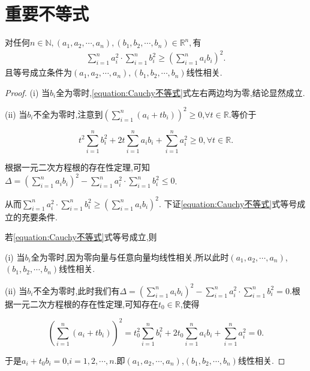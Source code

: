 \documentclass[../../main.tex]{subfiles}
\begin{document}
\section{重要不等式}

\begin{theorem}[Cauchy不等式]\label{theorem:Cauchy不等式}
对任何$n\in \mathbb{N} ,\left( a_1,a_2,\cdots ,a_n \right) ,\left( b_1,b_2,\cdots ,b_n \right) \in \mathbb{R} ^n,$有
\begin{align}\label{equation:Cauchy不等式}
\sum\limits_{i=1}^n{a_{i}^{2}\cdot}\sum\limits_{i=1}^n{b_{i}^{2}}\geqslant \left( \sum\limits_{i=1}^n{a_ib_i} \right) ^2.
\end{align}
且等号成立条件为$\left( a_1,a_2,\cdots ,a_n \right) ,\left( b_1,b_2,\cdots ,b_n \right)$线性相关.
\end{theorem}
\begin{proof}
(i) 当\(b_i\)全为零时,\eqref{equation:Cauchy不等式}式左右两边均为零,结论显然成立.

(ii) 当\(b_i\)不全为零时,注意到\(\left(\sum\limits_{i = 1}^{n}(a_i + tb_i)\right)^2 \geqslant 0\),\(\forall t \in \mathbb{R}\).等价于

\[
t^2\sum\limits_{i = 1}^{n}b_{i}^{2} + 2t\sum\limits_{i = 1}^{n}a_ib_i + \sum\limits_{i = 1}^{n}a_{i}^{2} \geqslant 0,  \forall t \in \mathbb{R}.
\]

根据一元二次方程根的存在性定理,可知\(\Delta = \left(\sum\limits_{i = 1}^{n}a_ib_i\right)^2 - \sum\limits_{i = 1}^{n}a_{i}^{2} \cdot \sum\limits_{i = 1}^{n}b_{i}^{2} \leqslant 0\).

从而\(\sum\limits_{i = 1}^{n}a_{i}^{2} \cdot \sum\limits_{i = 1}^{n}b_{i}^{2} \geqslant \left(\sum\limits_{i = 1}^{n}a_ib_i\right)^2\).
下证\eqref{equation:Cauchy不等式}式等号成立的充要条件.

若\eqref{equation:Cauchy不等式}式等号成立,则

(i) 当\(b_i\)全为零时,因为零向量与任意向量均线性相关,所以此时\((a_1,a_2,\cdots,a_n)\),\((b_1,b_2,\cdots,b_n)\)线性相关.

(ii) 当\(b_i\)不全为零时,此时我们有\(\Delta = \left(\sum\limits_{i = 1}^{n}a_ib_i\right)^2 - \sum\limits_{i = 1}^{n}a_{i}^{2} \cdot \sum\limits_{i = 1}^{n}b_{i}^{2} = 0\).根据一元二次方程根的存在性定理,可知存在\(t_0 \in \mathbb{R}\),使得

\[
\left(\sum\limits_{i = 1}^{n}(a_i + tb_i)\right)^2 = t_{0}^{2}\sum\limits_{i = 1}^{n}b_{i}^{2} + 2t_0\sum\limits_{i = 1}^{n}a_ib_i + \sum\limits_{i = 1}^{n}a_{i}^{2} = 0.
\]

于是\(a_i + t_0b_i = 0\),\(i = 1,2,\cdots,n\).即\((a_1,a_2,\cdots,a_n)\),\((b_1,b_2,\cdots,b_n)\)线性相关.


\end{proof}
\end{document}
